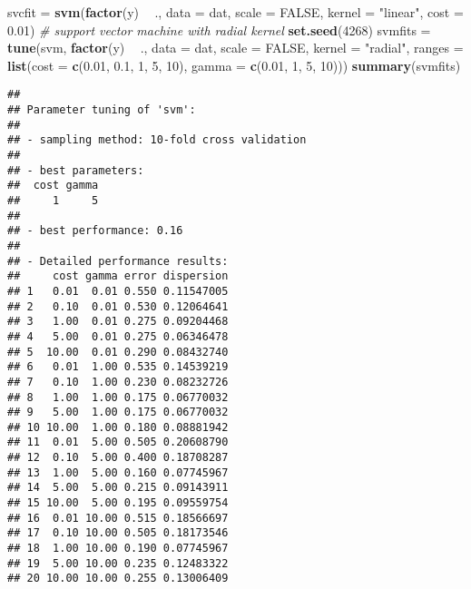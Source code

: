 \documentclass[]{article}
\newenvironment{Shaded}{\begin{snugshade}}{\end{snugshade}}
\newcommand{\KeywordTok}[1]{\textcolor[rgb]{0.13,0.29,0.53}{\textbf{#1}}}
\newcommand{\DataTypeTok}[1]{\textcolor[rgb]{0.13,0.29,0.53}{#1}}
\newcommand{\DecValTok}[1]{\textcolor[rgb]{0.00,0.00,0.81}{#1}}
\newcommand{\FloatTok}[1]{\textcolor[rgb]{0.00,0.00,0.81}{#1}}
\newcommand{\StringTok}[1]{\textcolor[rgb]{0.31,0.60,0.02}{#1}}
\newcommand{\CommentTok}[1]{\textcolor[rgb]{0.56,0.35,0.01}{\textit{#1}}}
\newcommand{\OtherTok}[1]{\textcolor[rgb]{0.56,0.35,0.01}{#1}}
\newcommand{\OperatorTok}[1]{\textcolor[rgb]{0.81,0.36,0.00}{\textbf{#1}}}
\newcommand{\NormalTok}[1]{#1}
\begin{document}
\begin{Shaded}
\begin{Highlighting}[]
\NormalTok{svcfit =}\StringTok{ }\KeywordTok{svm}\NormalTok{(}\KeywordTok{factor}\NormalTok{(y) }\OperatorTok{~}\StringTok{ }\NormalTok{., }\DataTypeTok{data =}\NormalTok{ dat, }\DataTypeTok{scale =} \OtherTok{FALSE}\NormalTok{, }\DataTypeTok{kernel =} \StringTok{"linear"}\NormalTok{, }
    \DataTypeTok{cost =} \FloatTok{0.01}\NormalTok{)}
\CommentTok{# support vector machine with radial kernel}
\KeywordTok{set.seed}\NormalTok{(}\DecValTok{4268}\NormalTok{)}
\NormalTok{svmfits =}\StringTok{ }\KeywordTok{tune}\NormalTok{(svm, }\KeywordTok{factor}\NormalTok{(y) }\OperatorTok{~}\StringTok{ }\NormalTok{., }\DataTypeTok{data =}\NormalTok{ dat, }\DataTypeTok{scale =} \OtherTok{FALSE}\NormalTok{, }\DataTypeTok{kernel =} \StringTok{"radial"}\NormalTok{, }
    \DataTypeTok{ranges =} \KeywordTok{list}\NormalTok{(}\DataTypeTok{cost =} \KeywordTok{c}\NormalTok{(}\FloatTok{0.01}\NormalTok{, }\FloatTok{0.1}\NormalTok{, }\DecValTok{1}\NormalTok{, }\DecValTok{5}\NormalTok{, }\DecValTok{10}\NormalTok{), }\DataTypeTok{gamma =} \KeywordTok{c}\NormalTok{(}\FloatTok{0.01}\NormalTok{, }\DecValTok{1}\NormalTok{, }\DecValTok{5}\NormalTok{, }
        \DecValTok{10}\NormalTok{)))}
\KeywordTok{summary}\NormalTok{(svmfits)}
\end{Highlighting}
\end{Shaded}

\begin{verbatim}
## 
## Parameter tuning of 'svm':
## 
## - sampling method: 10-fold cross validation 
## 
## - best parameters:
##  cost gamma
##     1     5
## 
## - best performance: 0.16 
## 
## - Detailed performance results:
##     cost gamma error dispersion
## 1   0.01  0.01 0.550 0.11547005
## 2   0.10  0.01 0.530 0.12064641
## 3   1.00  0.01 0.275 0.09204468
## 4   5.00  0.01 0.275 0.06346478
## 5  10.00  0.01 0.290 0.08432740
## 6   0.01  1.00 0.535 0.14539219
## 7   0.10  1.00 0.230 0.08232726
## 8   1.00  1.00 0.175 0.06770032
## 9   5.00  1.00 0.175 0.06770032
## 10 10.00  1.00 0.180 0.08881942
## 11  0.01  5.00 0.505 0.20608790
## 12  0.10  5.00 0.400 0.18708287
## 13  1.00  5.00 0.160 0.07745967
## 14  5.00  5.00 0.215 0.09143911
## 15 10.00  5.00 0.195 0.09559754
## 16  0.01 10.00 0.515 0.18566697
## 17  0.10 10.00 0.505 0.18173546
## 18  1.00 10.00 0.190 0.07745967
## 19  5.00 10.00 0.235 0.12483322
## 20 10.00 10.00 0.255 0.13006409
\end{verbatim}
\end{document}
